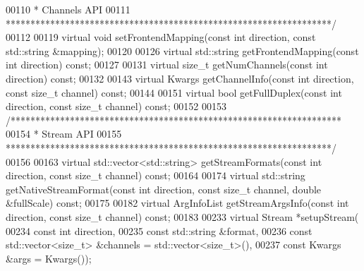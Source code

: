 \begin{DoxyCode}
00110 \textcolor{comment}{     * Channels API}
00111 \textcolor{comment}{     ******************************************************************/}
00112 
00119     \textcolor{keyword}{virtual} \textcolor{keywordtype}{void} setFrontendMapping(\textcolor{keyword}{const} \textcolor{keywordtype}{int} direction, \textcolor{keyword}{const} std::string &mapping);
00120 
00126     \textcolor{keyword}{virtual} std::string getFrontendMapping(\textcolor{keyword}{const} \textcolor{keywordtype}{int} direction) \textcolor{keyword}{const};
00127 
00131     \textcolor{keyword}{virtual} \textcolor{keywordtype}{size\_t} getNumChannels(\textcolor{keyword}{const} \textcolor{keywordtype}{int} direction) \textcolor{keyword}{const};
00132 
00143     \textcolor{keyword}{virtual} Kwargs getChannelInfo(\textcolor{keyword}{const} \textcolor{keywordtype}{int} direction, \textcolor{keyword}{const} \textcolor{keywordtype}{size\_t} channel) \textcolor{keyword}{const};
00144 
00151     \textcolor{keyword}{virtual} \textcolor{keywordtype}{bool} getFullDuplex(\textcolor{keyword}{const} \textcolor{keywordtype}{int} direction, \textcolor{keyword}{const} \textcolor{keywordtype}{size\_t} channel) \textcolor{keyword}{const};
00152 
00153     \textcolor{comment}{/*******************************************************************}
00154 \textcolor{comment}{     * Stream API}
00155 \textcolor{comment}{     ******************************************************************/}
00156 
00163     \textcolor{keyword}{virtual} std::vector<std::string> getStreamFormats(\textcolor{keyword}{const} \textcolor{keywordtype}{int} direction, \textcolor{keyword}{const} \textcolor{keywordtype}{size\_t} channel) \textcolor{keyword}{const};
00164 
00174     \textcolor{keyword}{virtual} std::string getNativeStreamFormat(\textcolor{keyword}{const} \textcolor{keywordtype}{int} direction, \textcolor{keyword}{const} \textcolor{keywordtype}{size\_t} channel, \textcolor{keywordtype}{double} &fullScale)
       \textcolor{keyword}{const};
00175 
00182     \textcolor{keyword}{virtual} ArgInfoList getStreamArgsInfo(\textcolor{keyword}{const} \textcolor{keywordtype}{int} direction, \textcolor{keyword}{const} \textcolor{keywordtype}{size\_t} channel) \textcolor{keyword}{const};
00183 
00233     \textcolor{keyword}{virtual} Stream *setupStream(
00234         \textcolor{keyword}{const} \textcolor{keywordtype}{int} direction,
00235         \textcolor{keyword}{const} std::string &format,
00236         \textcolor{keyword}{const} std::vector<size\_t> &channels = std::vector<size\_t>(),
00237         \textcolor{keyword}{const} Kwargs &args = Kwargs());

\end{DoxyCode}

